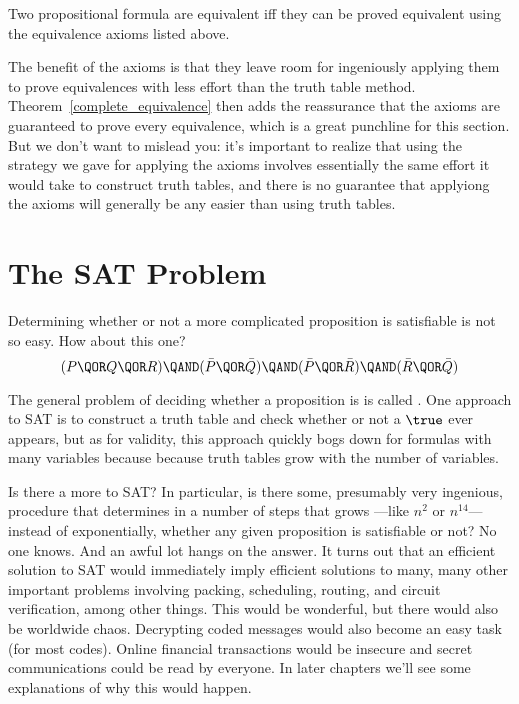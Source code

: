 \begin{theorem}
\label{complete_equivalence}
Two propositional formula are equivalent iff they can be proved
equivalent using the equivalence axioms listed above.
\end{theorem}

The benefit of the axioms is that they leave room for ingeniously
applying them to prove equivalences with less effort than the truth
table method.  Theorem~\ref{complete_equivalence} then adds the
reassurance that the axioms are guaranteed to prove every equivalence,
which is a great punchline for this section.  But we don't want to
mislead you: it's important to realize that using the strategy we gave
for applying the axioms involves essentially the same effort it would
take to construct truth tables, and there is no guarantee that applyiong the
axioms will generally be any easier than using truth tables.

\begin{problems}
\practiceproblems
{}

\classproblems
{}

\homeworkproblems
{}

\end{problems}

\section{The SAT Problem}\label{SAT_sec}
Determining whether or not a more complicated proposition is
satisfiable is not so easy.  How about this one?
%
\[
(P \QOR Q \QOR R) \QAND (\bar P \QOR \bar Q)
                  \QAND (\bar P \QOR \bar R)
                  \QAND (\bar R \QOR \bar Q)
\]

The general problem of deciding whether a proposition is 
is called .  One approach to SAT is to construct a truth table
and check whether or not a $\true$ ever appears, but as for validity, this
approach quickly bogs down for formulas with many variables because
because truth tables grow  with the number of
variables.

Is there a more  to SAT?  In particular, is there
some, presumably very ingenious, procedure that determines in a number of
steps that grows \emph{}---like
$n^2$ or $n^{14}$---instead of exponentially, whether any given
proposition is satisfiable or not?  No one knows.  And an awful lot hangs
on the answer.  It turns out that an efficient solution to SAT would
immediately imply efficient solutions to many, many other important
problems involving packing, scheduling, routing, and circuit verification,
among other things.  This would be wonderful, but there would also be
worldwide chaos.  Decrypting coded messages would also become an easy task
(for most codes).  Online financial transactions would be insecure and
secret communications could be read by everyone.  In later chapters we'll
see some explanations of why this would happen.

